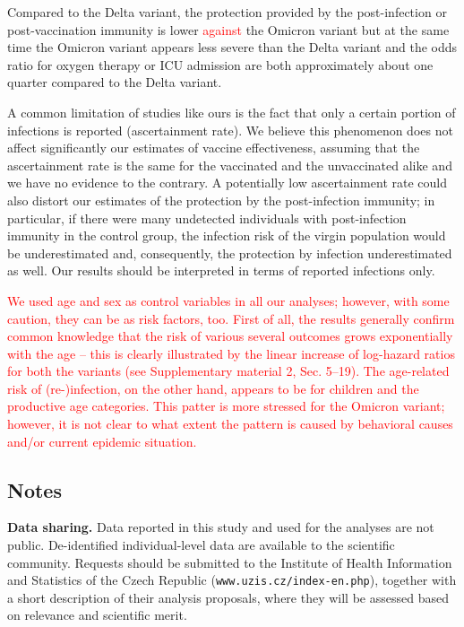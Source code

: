 \documentclass[a4paper,12pt]{article}
\newcommand{\new}[1]{\textcolor{red}{#1}}
\begin{document}
Compared to the Delta variant, the protection provided by the post-infection or post-vaccination immunity is lower \new{against} the Omicron variant but at the same time the Omicron variant appears less severe than the Delta variant and the odds ratio for oxygen therapy or ICU admission are both approximately about one quarter compared to the Delta variant.

A common limitation of studies like ours is the fact that only a certain portion of infections is reported (ascertainment rate).  We believe this phenomenon does not affect significantly our estimates of vaccine effectiveness, assuming that the ascertainment rate is the same for the vaccinated and the unvaccinated alike and we have no evidence to the contrary. A potentially low ascertainment rate could also distort our estimates of the protection by the post-infection immunity; in particular, if there were many undetected individuals with post-infection immunity in the control group, the infection risk of the virgin population would be underestimated and, consequently, the protection by infection underestimated as well. Our results should be interpreted in terms of reported infections only. 

\new{We used age and sex as control variables in all our analyses; however, with some caution, they can be as risk factors, too. First of all, the results generally confirm  common knowledge that the risk of various several outcomes grows exponentially with the age -- this is clearly illustrated by the linear increase of log-hazard ratios for both the variants (see Supplementary material 2, Sec. 5--19). The age-related risk of (re-)infection, on the other hand, appears to be for children and the productive age categories. This patter is more stressed for the Omicron variant; however, it is not clear to what extent the pattern is caused by behavioral causes and/or current epidemic situation.}


\subsection*{Notes}

{\bf Data sharing.} 
Data reported in this study and used for the analyses are not public. De-identified individual-level data are available to the scientific community. Requests should be submitted to the Institute of Health Information and Statistics of the Czech Republic  ({\tt www.uzis.cz/index-en.php}), together with a short description of their analysis proposals, where they will be assessed based on relevance and scientific merit.
\end{document}
